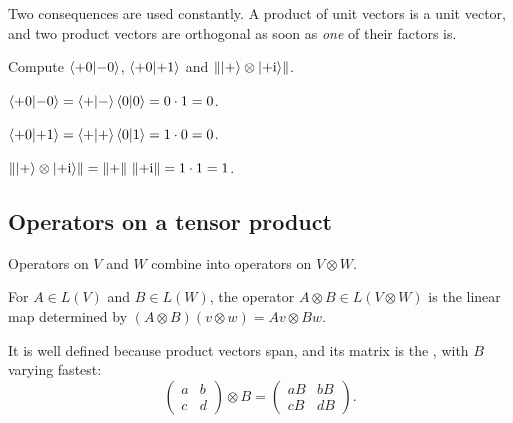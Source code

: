 Two consequences are used constantly. A product of unit vectors is a unit vector, and two product vectors are orthogonal as soon as \emph{one} of their factors is.

\begin{example}\label{ex:tensor-inner}
  Compute $\left\langle+0\middle|-0\right\rangle$, $\left\langle+0\middle|+1\right\rangle$ and $\left\|\left|+\right\rangle\otimes\left|+\mathrm{i}\right\rangle\right\|$.
\end{example}
\begin{solution}
  \begin{steps}
    \item $\left\langle+0\middle|-0\right\rangle=\left\langle+\middle|-\right\rangle\left\langle0\middle|0\right\rangle=0\cdot1=0$.
    \item $\left\langle+0\middle|+1\right\rangle=\left\langle+\middle|+\right\rangle\left\langle0\middle|1\right\rangle=1\cdot0=0$.
    \item $\left\|\left|+\right\rangle\otimes\left|+\mathrm{i}\right\rangle\right\|=\left\|+\right\|\,\left\|{+\mathrm{i}}\right\|=1\cdot1=1$.
  \end{steps}
\end{solution}

\subsection{Operators on a tensor product}

Operators on $V$ and $W$ combine into operators on $V\otimes W$.

\begin{definition}\label{def:tensor-op}
  For $A\in L(V)$ and $B\in L(W)$, the operator $A\otimes B\in L(V\otimes W)$ is the linear map determined by $(A\otimes B)(v\otimes w)=Av\otimes Bw$.
\end{definition}

It is well defined because product vectors span, and its matrix is the , with $B$ varying fastest:
\[
  \begin{pmatrix}a&b\\c&d\end{pmatrix}\otimes B=\begin{pmatrix}aB&bB\\cB&dB\end{pmatrix}.
\]

